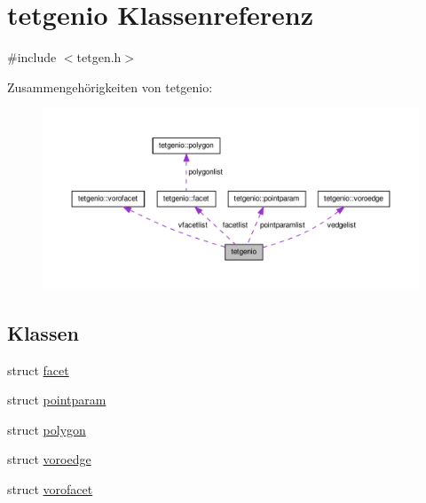 \hypertarget{classtetgenio}{\section{tetgenio Klassenreferenz}
\label{classtetgenio}
}


{\ttfamily \#include $<$tetgen.\-h$>$}



Zusammengehörigkeiten von tetgenio\-:\nopagebreak
\begin{figure}[H]
\begin{center}
\leavevmode
\includegraphics[width=350pt]{classtetgenio__coll__graph}
\end{center}
\end{figure}
\subsection*{Klassen}
\begin{DoxyCompactItemize}
\item 
struct \hyperlink{structtetgenio_1_1facet}{facet}
\item 
struct \hyperlink{structtetgenio_1_1pointparam}{pointparam}
\item 
struct \hyperlink{structtetgenio_1_1polygon}{polygon}
\item 
struct \hyperlink{structtetgenio_1_1voroedge}{voroedge}
\item 
struct \hyperlink{structtetgenio_1_1vorofacet}{vorofacet}
\end{DoxyCompactItemize}
